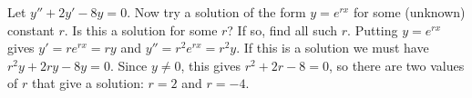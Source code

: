 {Let $y'' + 2y' - 8y = 0$.  Now try a solution of the form $y = e^{rx}$ for
some (unknown) constant $r$.  Is this a solution
for some $r$?  If so, find all such $r$.}
{Putting $y=e^{rx}$ gives $y' = re^{rx} = ry$ and $y'' = r^2e^{rx}=r^2y$. If this is a solution we must have $r^2y+2ry-8y=0$. Since $y\neq 0$, this gives $r^2+2r-8=0$, so there are two values of $r$ that give a solution: $r=2$ and $r=-4$.}